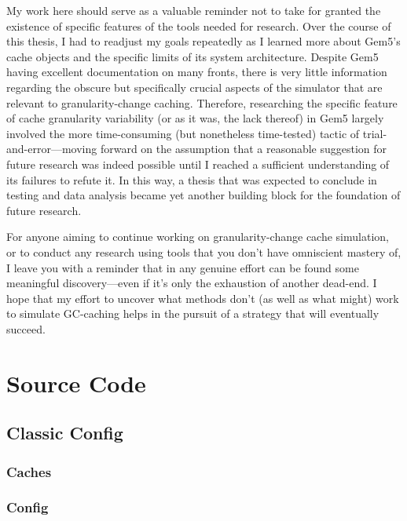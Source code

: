 \documentclass[12pt,twoside]{reedthesis}
\newcommand{\vstep}{\vspace{5mm}}
\begin{document}
	My work here should serve as a valuable reminder not to take for granted the existence of specific features of the tools needed for research. Over the course of this thesis, I had to readjust my goals repeatedly as I learned more about Gem5's cache objects and the specific limits of its system architecture. Despite Gem5 having excellent documentation on many fronts, there is very little information regarding the obscure but specifically crucial aspects of the simulator that are relevant to granularity-change caching. Therefore, researching the specific feature of cache granularity variability (or as it was, the lack thereof) in Gem5 largely involved the more time-consuming (but nonetheless time-tested) tactic of trial-and-error---moving forward on the assumption that a reasonable suggestion for future research was indeed possible until I reached a sufficient understanding of its failures to refute it. In this way, a thesis that was expected to conclude in testing and data analysis became yet another building block for the foundation of future research.

	For anyone aiming to continue working on granularity-change cache simulation, or to conduct any research using tools that you don't have omniscient mastery of, I leave you with a reminder that in any genuine effort can be found some meaningful discovery---even if it's only the exhaustion of another dead-end. I hope that my effort to uncover what methods don't (as well as what might) work to simulate GC-caching helps in the pursuit of a strategy that will eventually succeed.
	
\appendix

\chapter{Source Code}

\section{Classic Config}

\subsection*{Caches}

\vstep

\subsection*{Config}

\vstep
\end{document}
